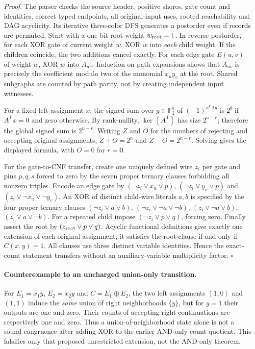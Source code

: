 \documentclass[11pt]{article}
\begin{document}
\emph{Proof.} The parser checks the source header, positive shores, gate count and identities, correct typed endpoints, all original-input uses, rooted reachability and DAG acyclicity. Its iterative three-color DFS generates a postorder even if records are permuted. Start with a one-bit root weight $w_{\rm root}=1$. In reverse postorder, for each XOR gate of current weight $w$, XOR $w$ into \emph{each} child weight. If the children coincide, the two additions cancel exactly. For each edge gate $E(u,v)$ of weight $w$, XOR $w$ into $A_{uv}$. Induction on path expansions shows that $A_{uv}$ is precisely the coefficient modulo two of the monomial $x_uy_v$ at the root. Shared subgraphs are counted by path parity, not by creating independent input witnesses.

For a fixed left assignment $x$, the signed sum over $y\in\mathbb F_2^b$ of $(-1)^{x^{\mathsf T}Ay}$ is $2^b$ if $A^{\mathsf T}x=0$ and zero otherwise. By rank-nullity, $\ker(A^{\mathsf T})$ has size $2^{a-r}$; therefore the global signed sum is $2^{n-r}$. Writing $Z$ and $O$ for the numbers of rejecting and accepting original assignments, $Z+O=2^n$ and $Z-O=2^{n-r}$. Solving gives the displayed formula, with $O=0$ for $r=0$.

For the gate-to-CNF transfer, create one uniquely defined wire $z_i$ per gate and pins $p,q,s$ forced to zero by the seven proper ternary clauses forbidding all nonzero triples. Encode an edge gate by $(\neg z_i\vee x_u\vee p)$, $(\neg z_i\vee y_v\vee p)$ and $(z_i\vee\neg x_u\vee\neg y_v)$. An XOR of distinct child-wire literals $a,b$ is specified by the four proper ternary clauses $(\neg z_i\vee a\vee b)$, $(\neg z_i\vee\neg a\vee\neg b)$, $(z_i\vee\neg a\vee b)$, $(z_i\vee a\vee\neg b)$. For a repeated child impose $(\neg z_i\vee p\vee q)$, forcing zero. Finally assert the root by $(z_{\rm root}\vee p\vee q)$. Acyclic functional definitions give exactly one extension of each original assignment; it satisfies the root clause if and only if $C(x,y)=1$. All clauses use three distinct variable identities. Hence the exact-count statement transfers without an auxiliary-variable multiplicity factor. \hfill$\square$

\paragraph{Counterexample to an uncharged union-only transition.}
For $E_1=x_1y$, $E_2=x_2y$ and $C=E_1\oplus E_2$, the two left assignments $(1,0)$ and $(1,1)$ induce the \emph{same} union of right neighborhoods $\{y\}$, but for $y=1$ their outputs are one and zero. Their counts of accepting right continuations are respectively one and zero. Thus a union-of-neighborhood state alone is not a sound congruence after adding XOR to the earlier AND-only count quotient. This falsifies only that proposed unrestricted extension, not the AND-only theorem.
\end{document}
